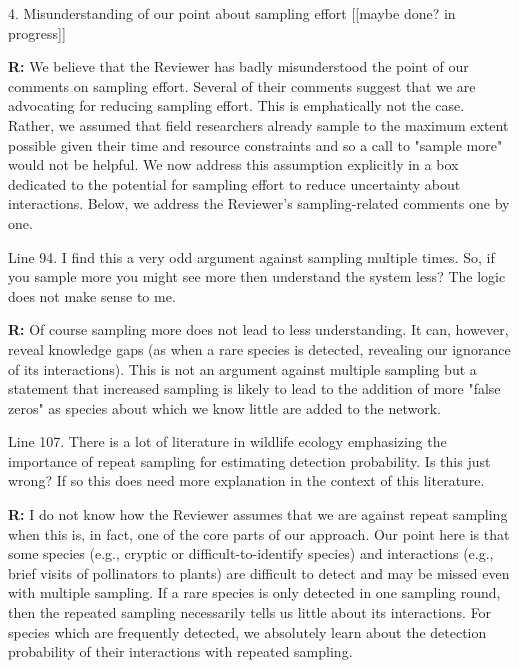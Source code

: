 \documentclass[12pt]{letter}
\newenvironment{refquote}{\bigskip \begin{it}}{\end{it}\smallskip}
\begin{document}
	4. Misunderstanding of our point about sampling effort [[maybe done? in progress]]

		\textbf{R:} We believe that the Reviewer has badly misunderstood the point of our comments on sampling effort. Several of their comments suggest that we are advocating for reducing sampling effort. This is emphatically not the case. Rather, we assumed that field researchers already sample to the maximum extent possible given their time and resource constraints and so a call to "sample more" would not be helpful. We now address this assumption explicitly in a box dedicated to the potential for sampling effort to reduce uncertainty about interactions. Below, we address the Reviewer's sampling-related comments one by one.


		\begin{refquote}
		Line 94.  I find this a very odd argument against sampling multiple times.  So, if you sample more you might see more then understand the system less?  The logic does not make sense to me. 
		\end{refquote}

		\textbf{R:} Of course sampling more does not lead to less understanding. It can, however, reveal knowledge gaps (as when a rare species is detected, revealing our ignorance of its interactions). This is not an argument against multiple sampling but a statement that increased sampling is likely to lead to the addition of more "false zeros" as species about which we know little are added to the network.

		\begin{refquote}
		Line 107.  There is a lot of literature in wildlife ecology emphasizing the importance of repeat sampling for estimating detection probability.  Is this just wrong?  If so this does need more explanation in the context of this literature.
		\end{refquote}

		\textbf{R:} I do not know how the Reviewer assumes that we are against repeat sampling when this is, in fact, one of the core parts of our approach. Our point here is that some species (e.g., cryptic or difficult-to-identify species) and interactions (e.g., brief visits of pollinators to plants) are difficult to detect and may be missed even with multiple sampling. If a rare species is only detected in one sampling round, then the repeated sampling necessarily tells us little about its interactions. For species which are frequently detected, we absolutely learn about the detection probability of their interactions with repeated sampling.
\end{document}
